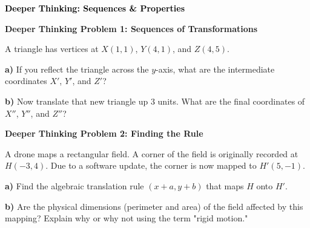 \documentclass[12pt, letterpaper, fleqn]{article}
\begin{document}
\newpage

\begin{tcolorbox}[colback=customteal!20]
\large\textcolor{black}{\textbf{Deeper Thinking: Sequences \& Properties}}
\end{tcolorbox}

\vspace{3mm}

\begin{tcolorbox}[colback=white!15, colframe=black, boxrule=1.5pt, arc=4mm, left=6mm, right=6mm, top=5mm, bottom=5mm]

\textbf{Deeper Thinking Problem 1: Sequences of Transformations}

\medskip

\noindent
A triangle has vertices at $X(1, 1)$, $Y(4, 1)$, and $Z(4, 5)$. 

\vspace{5mm}

\noindent
\textbf{a)} If you reflect the triangle across the $y$-axis, what are the intermediate coordinates $X'$, $Y'$, and $Z'$?

\vspace{2.5cm}

\noindent
\textbf{b)} Now translate that new triangle up 3 units. What are the final coordinates of $X''$, $Y''$, and $Z''$?

\vspace{2.5cm}

\end{tcolorbox}

\vspace{4mm}

\begin{tcolorbox}[colback=white!15, colframe=black, boxrule=1.5pt, arc=4mm, left=6mm, right=6mm, top=5mm, bottom=5mm]

\textbf{Deeper Thinking Problem 2: Finding the Rule}

\medskip

\noindent
A drone maps a rectangular field. A corner of the field is originally recorded at $H(-3, 4)$. Due to a software update, the corner is now mapped to $H'(5, -1)$.

\vspace{5mm}

\noindent
\textbf{a)} Find the algebraic translation rule $(x+a, y+b)$ that maps $H$ onto $H'$.

\vspace{3cm}

\noindent
\textbf{b)} Are the physical dimensions (perimeter and area) of the field affected by this mapping? Explain why or why not using the term "rigid motion."

\vspace{3cm}

\end{tcolorbox}
\end{document}
